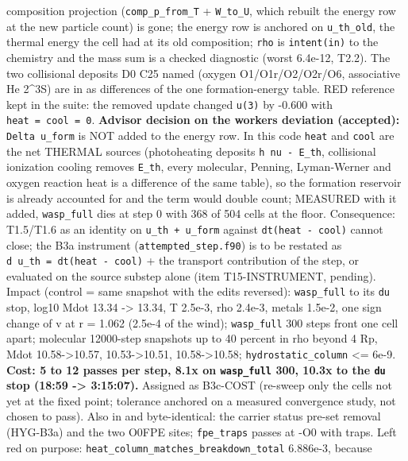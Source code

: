 \documentclass[english,a4paper]{my_memo}
\begin{document}
\begin{itemize}
  composition projection (\texttt{comp\_p\_from\_T} + \texttt{W\_to\_U}, which rebuilt the
  energy row at the new particle count) is gone; the energy row is anchored
  on \texttt{u\_th\_old}, the thermal energy the cell had at its old composition;
  \texttt{rho} is \texttt{intent(in)} to the chemistry and the mass sum is a checked
  diagnostic (worst 6.4e-12, T2.2). The two collisional deposits D0 C25
  named (oxygen O1/O1r/O2/O2r/O6, associative He 2\^{}3S) are in as differences
  of the one formation-energy table. RED reference kept in the suite: the
  removed update changed \texttt{u(3)} by -0.600 with \texttt{heat\ =\ cool\ =\ 0}.
  \textbf{Advisor decision on the worker\textquotesingle s deviation (accepted):} \texttt{Delta\ u\_form}
  is NOT added to the energy row. In this code \texttt{heat} and \texttt{cool} are the net
  THERMAL sources (photoheating deposits \texttt{h\ nu\ -\ E\_th}, collisional
  ionization cooling removes \texttt{E\_th}, every molecular, Penning, Lyman-Werner
  and oxygen reaction heat is a difference of the same table), so the
  formation reservoir is already accounted for and the term would double
  count; MEASURED with it added, \texttt{wasp\_full} dies at step 0 with 368 of 504
  cells at the floor. Consequence: T1.5/T1.6 as an identity on
  \texttt{u\_th\ +\ u\_form} against \texttt{dt(heat\ -\ cool)} cannot close; the B3a instrument
  (\texttt{attempted\_step.f90}) is to be restated as \texttt{d\ u\_th\ =\ dt(heat\ -\ cool)} +
  the transport contribution of the step, or evaluated on the source substep
  alone (item T15-INSTRUMENT, pending). Impact (control = same snapshot with
  the edits reversed): \texttt{wasp\_full} to its \texttt{du} stop, log10 Mdot 13.34 -\textgreater{}
  13.34, T 2.5e-3, rho 2.4e-3, metals 1.5e-2, one sign change of v at r =
  1.062 (2.5e-4 of the wind); \texttt{wasp\_full} 300 steps front one cell apart;
  molecular 12000-step snapshots up to 40 percent in rho beyond 4 Rp, Mdot
  10.58-\textgreater10.57, 10.53-\textgreater10.51, 10.58-\textgreater10.58; \texttt{hydrostatic\_column} \textless= 6e-9.
  \textbf{Cost: 5 to 12 passes per step, 8.1x on \texttt{wasp\_full} 300, 10.3x to the
  \texttt{du} stop (18:59 -\textgreater{} 3:15:07).} Assigned as B3c-COST (re-sweep only the
  cells not yet at the fixed point; tolerance anchored on a measured
  convergence study, not chosen to pass). Also in and byte-identical: the
  carrier status pre-set removal (HYG-B3a) and the two O0FPE sites;
  \texttt{fpe\_traps} passes at -O0 with traps. Left red on purpose:
  \texttt{heat\_column\_matches\_breakdown\_total} 6.886e-3, because

\end{itemize}
\end{document}
